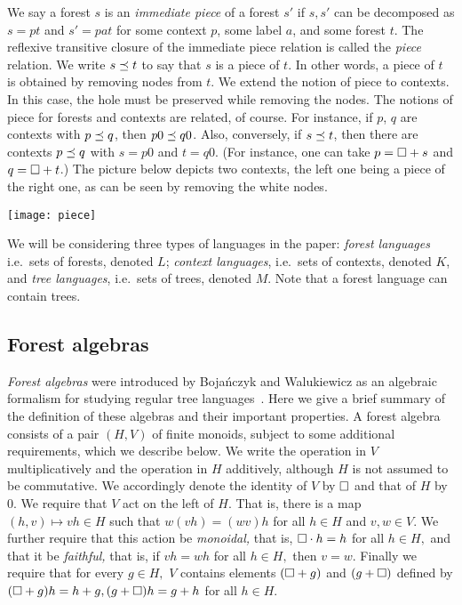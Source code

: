 \documentclass{LMCS}
\begin{document}
We say a forest $s$ is an \emph{immediate piece} of a forest $s'$ if
$s,s'$ can be decomposed as $s=pt$ and $s'=pat$ for some context $p$,
some label $a$, and some forest $t$. The reflexive transitive closure
of the immediate piece relation is called the \emph{piece}
relation. We write $s \preceq t$ to say that $s$ is a piece of $t$. In
other words, a piece of $t$ is obtained by removing nodes from $t$.
We extend the notion of piece to contexts. In this case, the hole must
be preserved while removing the nodes. The notions of piece for
forests and contexts are related, of course. For instance, if $p$, $q$
are contexts with $p \preceq q$, then $p0 \preceq q0$. Also, conversely,
if $s \preceq t$, then there are contexts $p \preceq q$ with $s=p0$ and
$t=q0$. (For instance, one can take $p=\Box + s$ and $q=\Box + t$.)
The picture below depicts two contexts, the left one being a piece of
the right one, as can be seen by removing the white nodes.
\medskip
\begin{center}
  \texttt{[image: piece]}
 \end{center}
We will be considering three types of languages in the paper:
 \emph{forest languages} i.e.~sets of forests, denoted $L$;
 \emph{context languages}, i.e.~sets of contexts, denoted $K$, and
 \emph{tree languages}, i.e.~sets of trees, denoted $M$. Note that a
 forest language can contain trees.

\subsection{Forest algebras}
\label{sec:forest-algebra}
{\it Forest algebras} were introduced by Boja\'nczyk and Walukiewicz as an
algebraic formalism for studying regular tree languages~\cite{forestalgebra}.  Here
we give a brief summary of the definition of these algebras and their important
properties.  A forest algebra consists of a pair $(H,V)$ of finite monoids,
subject to some additional requirements, which we describe below.  We write the
operation in $V$ multiplicatively and the operation in $H$ additively, although
$H$ is not assumed to be commutative.  We accordingly denote the identity of
$V$ by $\Box$ and that of $H$ by 0.
We require that $V$ act on the left of $H$.  That is, there is a map
 $(h,v)\mapsto vh\in H$
 such that 
 $w(vh)=(wv)h$
 for all $h\in H$ and $v,w\in V.$ We further require that this action be {\it
   monoidal,} that is,
$\Box \cdot h=h$
 for all $h\in H,$ and that it be {\it faithful,} that is,
 if $vh=wh$ for all $h\in H,$ then $v=w.$
Finally we require that for every $g\in H,$ $V$ contains elements $(\Box+g)$
 and $(g+\Box)$ defined by
 $(\Box+g)h=h+g, (g+\Box)h=g+h$
 for all $h\in H.$
\end{document}
